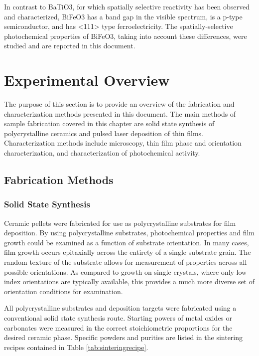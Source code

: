 \documentclass[12pt,%
              twoside,
               letterpaper]{uiothesis}
\begin{document}
In contrast to BaTiO3, for which spatially selective reactivity has been observed and
characterized, BiFeO3 has a band gap in the visible spectrum, is a p-type
semiconductor, and has <111> type ferroelectricity. The spatially-selective photochemical
properties of BiFeO3, taking into account these differences, were studied and are
reported in this document.




\chapter{Experimental Overview}
\label{ch:experimental}


The purpose of this section is to provide an overview of the fabrication and
characterization methods presented in this document. The main methods of sample
fabrication covered in this chapter are solid state synthesis of polycrystalline ceramics
and pulsed laser deposition of thin films. Characterization methods include microscopy,
thin film phase and orientation characterization, and characterization of photochemical
activity.


\section{Fabrication Methods}
\label{sec:exp.fabrication}


\subsection{Solid State Synthesis}
\label{subsec:exp.solidstate}


Ceramic pellets were fabricated for use as polycrystalline substrates for film deposition.
By using polycrystalline substrates, photochemical properties and film growth could be
examined as a function of substrate orientation. In many cases, film growth occurs
epitaxially across the entirety of a single substrate grain. The random texture of the
substrate allows for measurement of properties across all possible orientations. As
compared to growth on single crystals, where only low index orientations are typically
available, this provides a much more diverse set of orientation conditions for
examination. 

All polycrystalline substrates and deposition targets were fabricated using a conventional
solid state synthesis route. Starting powers of metal oxides or carbonates were measured
in the correct stoichiometric proportions for the desired ceramic phase. Specific powders
and purities are listed in the sintering recipes contained in Table
\ref{tab:sinteringrecipe}.
 
\end{document}

